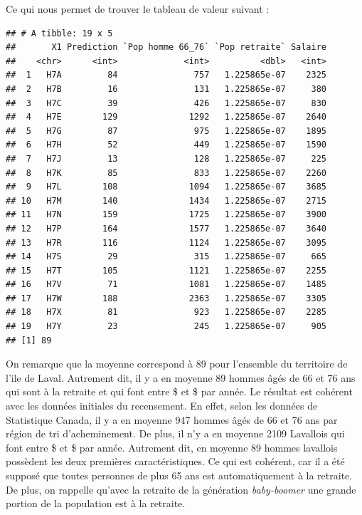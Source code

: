 \documentclass[11pt,french]{article}\usepackage[]{graphicx}\usepackage[]{color}
\makeatletter
\newenvironment{kframe}{%
 \def\at@end@of@kframe{}%
 \ifinner\ifhmode%
  \def\at@end@of@kframe{\end{minipage}}%
  \begin{minipage}{\columnwidth}%
 \fi\fi%
 \def\FrameCommand##1{\hskip\@totalleftmargin \hskip-\fboxsep
 \colorbox{shadecolor}{##1}\hskip-\fboxsep
     \hskip-\linewidth \hskip-\@totalleftmargin \hskip\columnwidth}%
 \MakeFramed {\advance\hsize-\width
   \@totalleftmargin\z@ \linewidth\hsize
   \@setminipage}}%
 {\par\unskip\endMakeFramed%
 \at@end@of@kframe}
\newenvironment{knitrout}{}{} %
\makeatother
\begin{document}
Ce qui nous permet de trouver le tableau de valeur suivant :
\begin{knitrout}
\color{fgcolor}\begin{kframe}
\begin{verbatim}
## # A tibble: 19 x 5
##       X1 Prediction `Pop homme 66_76` `Pop retraite` Salaire
##    <chr>      <int>             <int>          <dbl>   <int>
##  1   H7A         84               757   1.225865e-07    2325
##  2   H7B         16               131   1.225865e-07     380
##  3   H7C         39               426   1.225865e-07     830
##  4   H7E        129              1292   1.225865e-07    2640
##  5   H7G         87               975   1.225865e-07    1895
##  6   H7H         52               449   1.225865e-07    1590
##  7   H7J         13               128   1.225865e-07     225
##  8   H7K         85               833   1.225865e-07    2260
##  9   H7L        108              1094   1.225865e-07    3685
## 10   H7M        140              1434   1.225865e-07    2715
## 11   H7N        159              1725   1.225865e-07    3900
## 12   H7P        164              1577   1.225865e-07    3640
## 13   H7R        116              1124   1.225865e-07    3095
## 14   H7S         29               315   1.225865e-07     665
## 15   H7T        105              1121   1.225865e-07    2255
## 16   H7V         71              1081   1.225865e-07    1485
## 17   H7W        188              2363   1.225865e-07    3305
## 18   H7X         81               923   1.225865e-07    2285
## 19   H7Y         23               245   1.225865e-07     905
## [1] 89
\end{verbatim}
\end{kframe}
\end{knitrout}
On remarque que la moyenne correspond à 89 pour l'ensemble du territoire de l'ile de Laval. Autrement dit, il y a en moyenne 89 hommes âgés de 66 et 76 ans qui sont à la retraite et qui font entre \$ et  \$  par année. Le résultat est cohérent avec les données initiales du recensement. En effet, selon les données de Statistique Canada, il y a en moyenne 947 hommes âgés de 66 et 76 ans par région de tri d'acheminement. De plus, il n'y a en moyenne 2109 Lavallois qui font entre  \$ et  \$  par année. Autrement dit, en moyenne 89 hommes lavallois possèdent les deux premières caractéristiques. Ce qui est cohérent, car il a été supposé que toutes personnes de plus 65 ans est automatiquement à la retraite. De plus, on rappelle qu'avec la retraite de la génération \emph{baby-boomer} une grande portion de la population est à la retraite.
\end{document}
